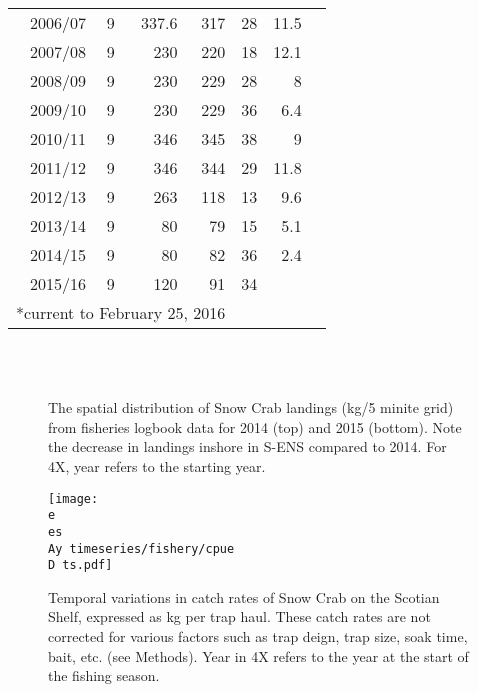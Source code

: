 \documentclass[paper=a4, fontsize=11pt]{article}
\newcommand{\D}{.}
\newcommand{\e}{/home/michelle/ecomod_data/}
\newcommand{\es}{snowcrab/}
\newcommand{\Ay}{assessments/2015/}
\begin{document}
\begin{table}[h]
\begin{center}
\begin{tabular}{rrrrrrr}
2006/07 &   9 & 337.6 & 317 & 28 & 11.5 \\ 
2007/08 &   9 & 230 & 220 & 18 & 12.1 \\ 
2008/09 &   9 & 230 & 229 & 28 & 8 \\ 
2009/10 &   9 & 230 & 229 & 36 & 6.4 \\ 
2010/11 &   9 & 346 & 345 & 38 & 9 \\ 
2011/12 &   9 & 346 & 344 & 29 & 11.8 \\ 
2012/13 &   9 & 263 & 118 & 13 & 9.6 \\ 
2013/14 &   9 & 80 &  79 & 15 & 5.1 \\ 
2014/15 &   9 & 80 &  82 & 36 & 2.4 \\ 
2015/16 &   9& 120 &  91 & 34 &  \\ 
   \hline
   \multicolumn{4}{c}{*current to February 25, 2016}
  \end{tabular}
  \end{center}
\end{table}



\begin{figure}[h]
	\centering
	\\
	\\
	\caption{The spatial distribution of Snow Crab landings (kg/5 minite grid) from fisheries logbook data for 2014 (top) and 2015 (bottom). Note the decrease in landings inshore in S-ENS compared to 2014. For 4X, year refers to the starting year.}
\end{figure}
\begin{figure}[h]
    \centering
    \texttt{[image: \\e \\es \\Ay timeseries/fishery/cpue\\D ts.pdf]}
    \caption{Temporal variations in catch rates of Snow Crab on the Scotian Shelf, expressed as kg per trap haul. These catch rates are not corrected for various factors such as trap deign, trap size, soak time, bait, etc. (see Methods). Year in 4X refers to the year at the start of the fishing season.}
\end{figure}
\end{document}
